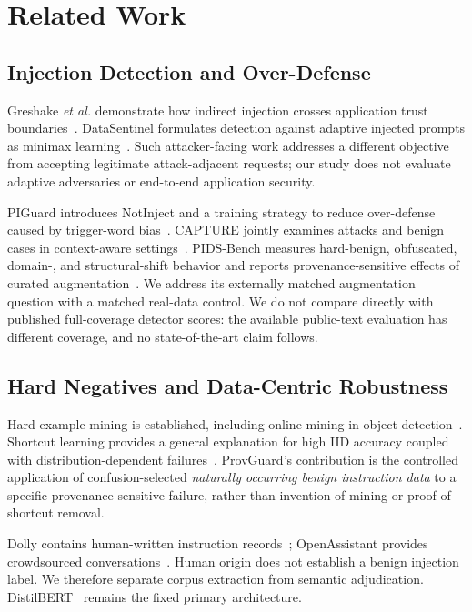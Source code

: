 \documentclass[conference]{IEEEtran}
\begin{document}
\section{Related Work}
\subsection{Injection Detection and Over-Defense}
Greshake \emph{et al.} demonstrate how indirect injection crosses application trust boundaries~\cite{greshake}. DataSentinel formulates detection against adaptive injected prompts as minimax learning~\cite{datasentinel}. Such attacker-facing work addresses a different objective from accepting legitimate attack-adjacent requests; our study does not evaluate adaptive adversaries or end-to-end application security.

PIGuard introduces NotInject and a training strategy to reduce over-defense caused by trigger-word bias~\cite{piguard}. CAPTURE jointly examines attacks and benign cases in context-aware settings~\cite{capture}. PIDS-Bench measures hard-benign, obfuscated, domain-, and structural-shift behavior and reports provenance-sensitive effects of curated augmentation~\cite{pids}. We address its externally matched augmentation question with a matched real-data control. We do not compare directly with published full-coverage detector scores: the available public-text evaluation has different coverage, and no state-of-the-art claim follows.

\subsection{Hard Negatives and Data-Centric Robustness}
Hard-example mining is established, including online mining in object detection~\cite{ohem}. Shortcut learning provides a general explanation for high IID accuracy coupled with distribution-dependent failures~\cite{shortcuts}. ProvGuard's contribution is the controlled application of confusion-selected \emph{naturally occurring benign instruction data} to a specific provenance-sensitive failure, rather than invention of mining or proof of shortcut removal.

Dolly contains human-written instruction records~\cite{dolly}; OpenAssistant provides crowdsourced conversations~\cite{oasst,oasstcard}. Human origin does not establish a benign injection label. We therefore separate corpus extraction from semantic adjudication. DistilBERT~\cite{distilbert} remains the fixed primary architecture.
\end{document}
